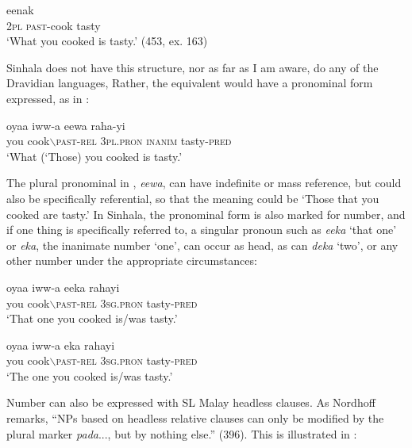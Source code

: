 \ea\label{ex3.3.8} 
 eenak\\
  2\textsc{pl}  \textsc{past}-cook {} tasty\\
  `What you cooked is tasty.' (453, ex. 163)
\z


Sinhala does not have this structure, nor as far as I am aware, do any of the Dravidian languages, Rather, the equivalent would have a pronominal form expressed, as in :


\ea\label{ex3.3.9} 
\gll   oyaa  iww-a  eewa  raha-yi\\
  you cook{$\backslash$}\textsc{past}-\textsc{rel} 3\textsc{pl}.\textsc{pron} \textsc{inanim} tasty-\textsc{pred} \\
  `What (`Those) you cooked is tasty.'
\z


The plural pronominal in , \textit{eewa}, can have indefinite or mass reference, but could also be specifically referential, so that the meaning could be `Those that you cooked are tasty.'
In Sinhala, the pronominal form is also marked for number, and if one thing is specifically referred to, a singular pronoun such as \textit{eeka} `that one' or \textit{eka}, the inanimate number `one', can occur as head, as can \textit{deka} `two', or any other number  under the appropriate circumstances:


\ea\label{ex3.3.10} 
\gll  oyaa iww-a  eeka   rahayi\\
  you cook{$\backslash$}\textsc{past}-\textsc{rel} 3\textsc{sg}.\textsc{pron} tasty-\textsc{pred} \\
  `That one you cooked is/was tasty.'
\z
 


\ea\label{ex3.3.11} 
\gll oyaa iww-a  eka   rahayi\\
  you cook{$\backslash$}\textsc{past}-\textsc{rel} 3\textsc{sg}.\textsc{pron} tasty-\textsc{pred} \\
  `The one you cooked is/was  tasty.\footnotemark'
\z{}

 Number can also be expressed with SL Malay headless clauses. As Nordhoff remarks, ``NPs based on headless relative clauses can only be modified by the plural marker \textit{pada}..., but by nothing else.'' (396). This is illustrated in :


